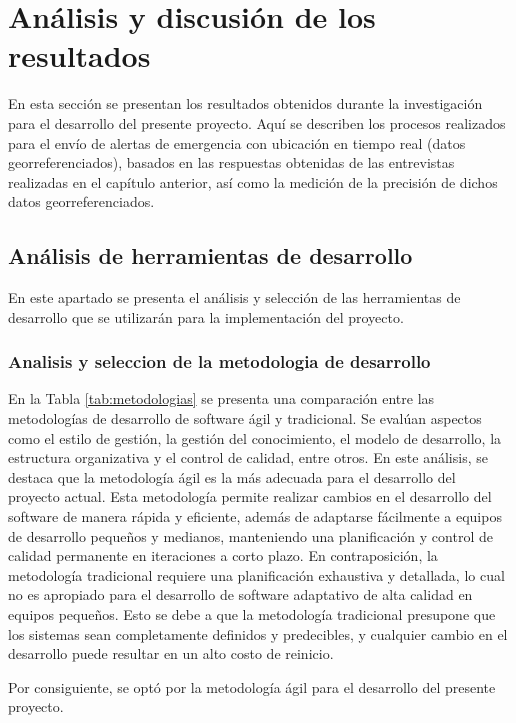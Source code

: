 \section{Análisis y discusión de los resultados}
En esta sección se presentan los resultados obtenidos durante la investigación para el desarrollo del
presente proyecto. Aquí se describen los procesos realizados para el envío de alertas de emergencia con
ubicación en tiempo real (datos georreferenciados), basados en las respuestas obtenidas de las entrevistas
realizadas en el capítulo anterior, así como la medición de la precisión de dichos datos georreferenciados.

\subsection{Análisis de herramientas de desarrollo}
En este apartado se presenta el análisis y selección de las herramientas de desarrollo que se utilizarán para la
implementación del proyecto.

\subsubsection{Analisis y seleccion de la metodologia de desarrollo}

En la Tabla \ref{tab:metodologias} se presenta una comparación entre las metodologías de desarrollo de software ágil
y tradicional. Se evalúan aspectos como el estilo de gestión, la gestión del conocimiento, el modelo de desarrollo,
la estructura organizativa y el control de calidad, entre otros. En este análisis, se destaca que la metodología ágil
es la más adecuada para el desarrollo del proyecto actual. Esta metodología permite realizar cambios en el desarrollo
del software de manera rápida y eficiente, además de adaptarse fácilmente a equipos de desarrollo pequeños y medianos,
manteniendo una planificación y control de calidad permanente en iteraciones a corto plazo. En contraposición, la
metodología tradicional requiere una planificación exhaustiva y detallada, lo cual no es apropiado para el desarrollo
de software adaptativo de alta calidad en equipos pequeños. Esto se debe a que la metodología tradicional presupone
que los sistemas sean completamente definidos y predecibles, y cualquier cambio en el desarrollo puede resultar en
un alto costo de reinicio.

\bigbreak
Por consiguiente, se optó por la metodología ágil para el desarrollo del presente proyecto.



